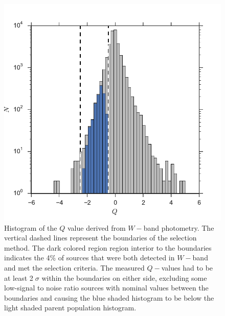 \begin{figure}[ht!]
	\caption[$W-$filter selection method]{Histogram of the $Q$ value derived from $W-$band photometry.  The vertical dashed lines represent the boundaries of the selection method.  The dark colored region region interior to the boundaries indicates the 4\% of sources that were both detected in $W-$band and met the selection criteria.  The measured $Q-$values had to be at least 2$\;\sigma$ within the boundaries on either side, excluding some low-signal to noise ratio sources with nominal values between the boundaries and causing the blue shaded histogram to be below the light shaded parent population histogram.  \label{fig_Q_value_histogram}}
\centering
\includegraphics[scale=0.6]{chIMACS/figures/W_phot_sel_mgs}
\end{figure}

